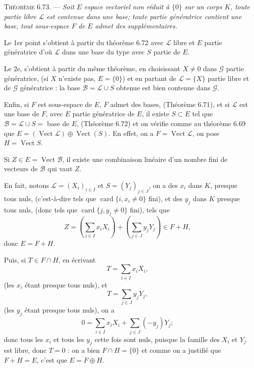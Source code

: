 \medskip\noindent\textsc{Théorème 6.73.} --- \emph{Soit $E$ espace vectoriel non réduit à $\{0\}$ sur un corps $K$, toute partie libre $\mathcal L$ est contenue dans une base; toute partie génératrice contient une base, tout sous-espace $F$ de $E$ admet des supplémentaires.}

Le 1er point s'obtient à partir du théorème 6.72 avec $\mathcal L$ libre et $E$ partie génératrice d'où $\mathcal L$ dans une base du type  avec $S$ partie de $E$.

Le 2e, s'obtient à partir du même théorème, en choisissant $X\ne0$ dans $\mathcal G$ partie génératrice, (si $X$ n'existe pas, $E=\{0\}$) et en partant de $\mathcal L=\{X\}$ partie libre et de $\mathcal G$ génératrice : la base $\mathcal B=\mathcal L\cup S$ obtenue est bien contenue dans $\mathcal G$.

Enfin, si $F$ est sous-espace de $E$, $F$ admet des bases, (Théorème 6.71), et si $\mathcal L$ est une base de $F$, avec $E$ partie génératrice de $E$, il existe $S\subset E$ tel que $\mathcal B=\mathcal L\cup S=$ base de $E$, (Théorème 6.72) et on vérifie comme au théorème 6.69 que $E=(\operatorname{Vect}\mathcal L)\oplus\operatorname{Vect}(S)$. En effet, on a $F=\operatorname{Vect}\mathcal L$, on pose $H=\operatorname{Vect}S$.

Si $Z\in E=\operatorname{Vect}\mathcal B$, il existe une combinaison linéaire d'un nombre fini de vecteurs de $\mathcal B$ qui vaut $Z$.

En fait, notons $\mathcal L=(X_i)_{i\in I}$ et $S=(Y_j)_{j\in J}$, on a des $x_i$ dans $K$, presque tous nuls, (c'est-à-dire tels que $\operatorname{card}\{i,x_i\ne0\}$ fini), et des $y_j$ dans $K$ presque tous nuls, (donc tels que $\operatorname{card}\{j,y_j\ne0\}$ fini), tels que
\[
Z=\left(\sum_{i\in I}x_iX_i\right)+\left(\sum_{j\in J}y_jY_j\right)\in F+H,
\]
donc $E=F+H$.

Puis, si $T\in F\cap H$, en écrivant
\[
T=\sum_{i\in I}x_iX_i,
\]
(les $x_i$ étant presque tous nuls), et
\[
T=\sum_{j\in J}y_jY_j,
\]
(les $y_j$ étant presque tous nuls), on a
\[
0=\sum_{i\in I}x_iX_i+\sum_{j\in J}(-y_j)Y_j;
\]
donc tous les $x_i$ et tous les $y_j$ cette fois sont nuls, puisque la famille des $X_i$ et $Y_j$ est libre, donc $T=0$ : on a bien $F\cap H=\{0\}$ et comme on a justifié que $F+H=E$, c'est que $E=F\oplus H$. \bookend

